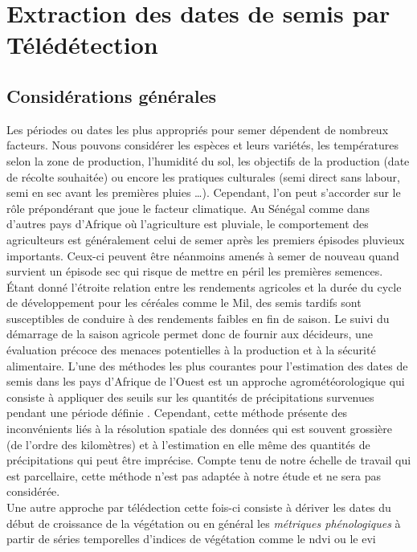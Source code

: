 \section{Extraction des dates de semis par Télédétection}
  
  \subsection{Considérations générales} \label{general}
  
Les périodes ou dates les plus appropriés pour semer dépendent de nombreux facteurs.  Nous pouvons considérer les espèces et leurs variétés, les températures 
selon la zone de production, l'humidité du sol, les objectifs de la production (date de récolte souhaitée) ou encore les pratiques culturales (semi direct sans labour, semi en sec avant les premières pluies \ldots{}). Cependant, l'on peut
s'accorder sur le rôle prépondérant que joue le facteur climatique. Au Sénégal comme dans d'autres pays d'Afrique où l'agriculture est pluviale, le comportement des agriculteurs est
généralement celui de semer après les premiers épisodes pluvieux importants. Ceux-ci peuvent être néanmoins amenés à semer de nouveau quand survient un épisode sec qui risque de
mettre en péril les premières semences.\\ \'Etant donné l'étroite relation entre les rendements agricoles et la durée du cycle de développement pour les céréales comme le Mil, 
des semis tardifs sont susceptibles de 
conduire à des rendements faibles en fin de saison. Le suivi du démarrage de la saison agricole permet donc de fournir aux décideurs, une évaluation précoce des menaces potentielles 
à la production et à la sécurité alimentaire. L'une des méthodes les plus courantes pour l'estimation des dates de semis dans les pays d'Afrique de l'Ouest est un approche agrométéorologique 
qui consiste à appliquer des seuils sur les quantités de précipitations survenues pendant une période définie \citep{Marinho2014}. Cependant, cette méthode présente des inconvénients liés 
à la résolution spatiale des données qui est souvent grossière (de l'ordre des kilomètres) et à l'estimation en elle même des quantités de précipitations qui peut être imprécise. 
Compte tenu de notre échelle de travail qui est parcellaire, cette méthode n'est pas adaptée à notre étude et ne sera pas considérée. \\Une autre approche par télédection cette fois-ci
consiste à dériver les dates du début de croissance de la végétation ou en général les \emph{métriques phénologiques} à partir de séries temporelles d'indices de végétation comme le \acrshort{ndvi} ou le \acrshort{evi} 
